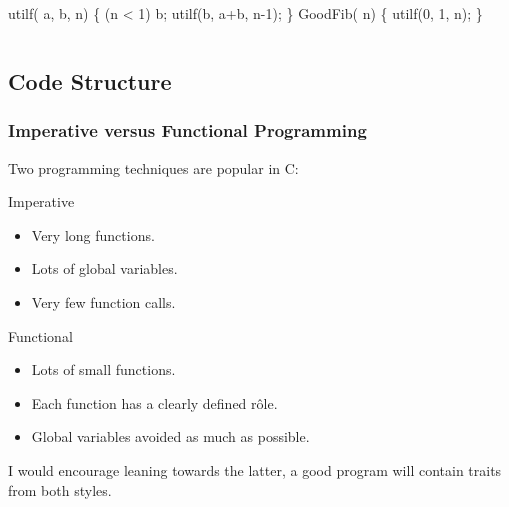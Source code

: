\documentclass[smaller,handout,table]{beamer}
\begin{document}
\begin{frame}[fragile]
\begin{columns}
\begin{column}{7cm}
\begin{exampleblock}{}
\begin{semiverbatim}
 utilf( a,  b,  n)
\{
   (n < 1)  b;
    utilf(b, a+b, n-1);
\}
 GoodFib( n)
\{
    utilf(0, 1, n);
\}
\end{semiverbatim}
\end{exampleblock}
\end{column}
\begin{column}{3cm}
\end{column}
\end{columns}
\end{frame}

\subsection{Code Structure}
\begin{frame}
\frametitle{Imperative versus Functional Programming}
Two programming techniques are popular in C:
\begin{alertblock}{Imperative}
\begin{itemize}
\item Very long functions.
\item Lots of global variables.
\item Very few function calls.
\end{itemize}
\end{alertblock}

\begin{exampleblock}{Functional}
\begin{itemize}
\item Lots of small functions.
\item Each function has a clearly defined r\^ole.
\item Global variables avoided as much as possible.
\end{itemize}
\end{exampleblock}
I would encourage leaning towards the latter, a good program will contain traits from both styles.
\end{frame}
\end{document}

